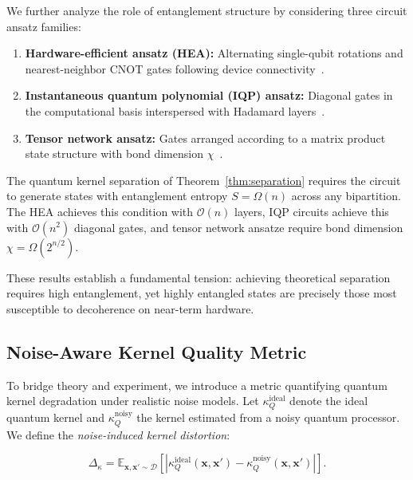 \documentclass[aps,prb,reprint,superscriptaddress,showpacs]{revtex4-2}
\begin{document}
We further analyze the role of entanglement structure by considering three circuit ansatz families:
\begin{enumerate}[label=(\roman*)]
    \item \textbf{Hardware-efficient ansatz (HEA):} Alternating single-qubit rotations and nearest-neighbor CNOT gates following device connectivity~\cite{Kandala2017HardwareEfficient}.
    \item \textbf{Instantaneous quantum polynomial (IQP) ansatz:} Diagonal gates in the computational basis interspersed with Hadamard layers~\cite{Shepherd2009IQP}.
    \item \textbf{Tensor network ansatz:} Gates arranged according to a matrix product state structure with bond dimension $\chi$~\cite{Huggins2019TensorNetwork}.
\end{enumerate}

\begin{proposition}
\label{prop:entanglement}
The quantum kernel separation of Theorem~\ref{thm:separation} requires the circuit to generate states with entanglement entropy $S = \Omega(n)$ across any bipartition. The HEA achieves this condition with $\mathcal{O}(n)$ layers, IQP circuits achieve this with $\mathcal{O}(n^2)$ diagonal gates, and tensor network ansatze require bond dimension $\chi = \Omega(2^{n/2})$.
\end{proposition}

These results establish a fundamental tension: achieving theoretical separation requires high entanglement, yet highly entangled states are precisely those most susceptible to decoherence on near-term hardware.


\subsection{Noise-Aware Kernel Quality Metric}

To bridge theory and experiment, we introduce a metric quantifying quantum kernel degradation under realistic noise models. Let $\kappa_Q^{\text{ideal}}$ denote the ideal quantum kernel and $\kappa_Q^{\text{noisy}}$ the kernel estimated from a noisy quantum processor. We define the \emph{noise-induced kernel distortion}:

\begin{definition}
\begin{equation}
    \Delta_\kappa = \mathbb{E}_{\mathbf{x}, \mathbf{x}' \sim \mathcal{D}}\left[\left|\kappa_Q^{\text{ideal}}(\mathbf{x}, \mathbf{x}') - \kappa_Q^{\text{noisy}}(\mathbf{x}, \mathbf{x}')\right|\right].
\end{equation}
\end{definition}
\end{document}

